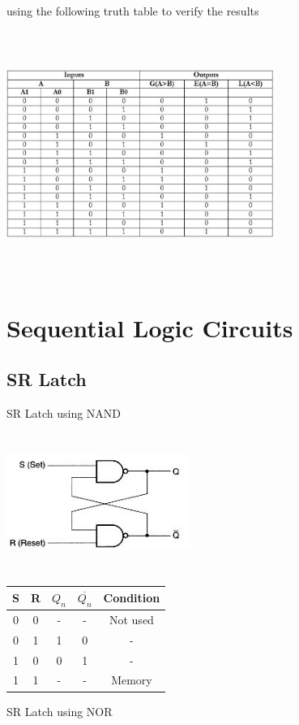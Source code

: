 \documentclass[journal,12pt,twocolumn]{IEEEtran}
\begin{document}
using the following truth table to verify the results

\vspace{0.5cm}
\includegraphics[width = 8.7cm, height = 8cm]{img/2-Bit-Comparator-Truth-Table}
\section{Sequential Logic Circuits}
\subsection{SR Latch}
\problem SR Latch using NAND

\vspace{0.5cm}
\includegraphics[width = 6cm, height = 4.5cm]{img/SRLatch}
\begin{table}[h!]
\centering
\begin{tabular}{|cc|cc|c|}
\hline
S	&	R	&	$Q_n$	&	$\overline{Q_n}$	& Condition \\\hline
0	&	0	&	 -		&		-		&	Not used		\\\hline
0	&	1	&	1		&		0		&		-	\\\hline
1	&	0	&	0		&		1		&		-	\\\hline
1	&	1	&	-		&		-		&	Memory		\\\hline	
\end{tabular}
\end{table}

\problem SR Latch using NOR
\end{document}
